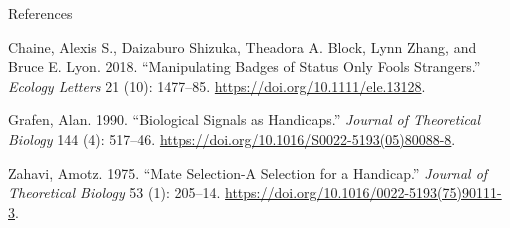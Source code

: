 \documentclass[
  ignorenonframetext,
]{beamer}
\begin{document}
\begin{frame}{References}
\protect\hypertarget{references}{}

\hypertarget{refs}{}
\leavevmode\hypertarget{ref-chaine_Manipulating_2018}{}%
Chaine, Alexis S., Daizaburo Shizuka, Theadora A. Block, Lynn Zhang, and
Bruce E. Lyon. 2018. ``Manipulating Badges of Status Only Fools
Strangers.'' \emph{Ecology Letters} 21 (10): 1477--85.
\url{https://doi.org/10.1111/ele.13128}.

\leavevmode\hypertarget{ref-grafen_Biological_1990}{}%
Grafen, Alan. 1990. ``Biological Signals as Handicaps.'' \emph{Journal
of Theoretical Biology} 144 (4): 517--46.
\url{https://doi.org/10.1016/S0022-5193(05)80088-8}.

\leavevmode\hypertarget{ref-zahavi_Mate_1975}{}%
Zahavi, Amotz. 1975. ``Mate Selection-A Selection for a Handicap.''
\emph{Journal of Theoretical Biology} 53 (1): 205--14.
\url{https://doi.org/10.1016/0022-5193(75)90111-3}.

\end{frame}
\end{document}
